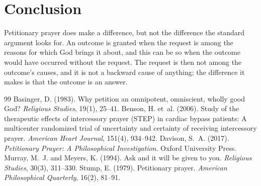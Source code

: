 \documentclass{situationist-preprint}
\begin{document}
\section{Conclusion}

Petitionary prayer does make a difference, but not the difference the standard argument looks for. An outcome is granted when the request is among the reasons for which God brings it about, and this can be so when the outcome would have occurred without the request. The request is then not among the outcome's causes, and it is not a backward cause of anything; the difference it makes is that the outcome is an answer.

\begin{thebibliography}{99}\small
{} Basinger, D. (1983). Why petition an omnipotent, omniscient, wholly good God? \emph{Religious Studies}, 19(1), 25--41.
 Benson, H. et~al. (2006). Study of the therapeutic effects of intercessory prayer (STEP) in cardiac bypass patients: A multicenter randomized trial of uncertainty and certainty of receiving intercessory prayer. \emph{American Heart Journal}, 151(4), 934--942.
 Davison, S.~A. (2017). \emph{Petitionary Prayer: A Philosophical Investigation}. Oxford University Press.
 Murray, M.~J. and Meyers, K. (1994). Ask and it will be given to you. \emph{Religious Studies}, 30(3), 311--330.
 Stump, E. (1979). Petitionary prayer. \emph{American Philosophical Quarterly}, 16(2), 81--91.
\end{thebibliography}
\end{document}
